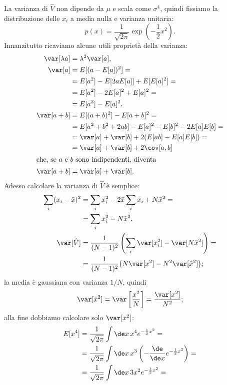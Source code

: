 \begin{solution}
	La varianza di $\hat V$ non dipende da $\mu$ e scala come $\sigma^4$,
	quindi fissiamo la distribuzione delle $x_i$ a media nulla e varianza unitaria:
	\begin{equation*}
		p(x) = \frac1{\sqrt{2\pi}} \exp\left(-\frac12x^2\right).
	\end{equation*}
	Innanzitutto ricaviamo alcune utili proprietà della varianza:
	\begin{align*}
		\var[\lambda a] &= \lambda^2 \var[a], \\
		\var[a]
		&= E[(a-E[a])^2] = \\
		&= E[a^2] - E[2aE[a]] + E[E[a]^2] = \\
		&= E[a^2] - 2E[a]^2 + E[a]^2 = \\
		&= E[a^2] - E[a]^2, \\
		\var[a+b]
		&= E[(a+b)^2] - E[a+b]^2 = \\
		&= E[a^2 + b^2 + 2ab] - E[a]^2 - E[b]^2 - 2E[a]E[b] = \\
		&= \var[a] + \var[b] + 2(E[ab] - E[a]E[b]) = \\
		&= \var[a] + \var[b] + 2\cov[a,b] \\
		\intertext{che, se $a$ e $b$ sono indipendenti, diventa}
		\var[a+b] &= \var[a] + \var[b].
	\end{align*}
	Adesso calcolare la varianza di $\hat V$ è semplice:
	\begin{align*}
		\sum_i (x_i-\bar x)^2
		&= \sum_ix_i^2 - 2\bar x\sum_ix_i + N\bar x^2 = \\
		&= \sum_ix_i^2 - N\bar x^2, \\
		\var[\hat V]
		&= \frac1{(N-1)^2} \left( \sum_i\var[x_i^2] - \var[N\bar x^2] \right) = \\
		&= \frac1{(N-1)^2} \big( N\var[x^2] - N^2\var[\bar x^2] \big);
	\end{align*}
	la media è gaussiana con varianza $1/N$, quindi
	\begin{align*}
		\var[\bar x^2]
		= \var \left[ \frac{x^2}N \right ]
		= \frac{\var[x^2]}{N^2};
	\end{align*}
	alla fine dobbiamo calcolare solo $\var[x^2]$:
	\begin{align*}
		E[x^4]
		&= \frac1{\sqrt{2\pi}} \int\de x\, x^4 e^{-\frac12 x^2} = \\
		&= \frac1{\sqrt{2\pi}} \int\de x\, x^3 \left (-\frac{\de}{\de x} e^{-\frac12 x^2} \right) = \\
		&= \frac1{\sqrt{2\pi}} \int\de x\, 3x^2 e^{-\frac12 x^2} = \\

\end{align*}
\end{solution}
